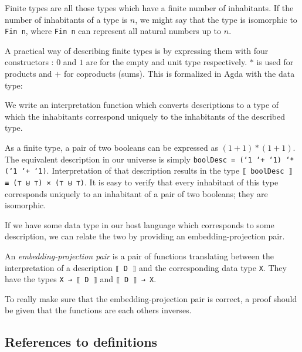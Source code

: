 Finite types are all those types which have a finite number of
inhabitants.
If the number of inhabitants of a type is $n$, we might say that the
type is isomorphic to \texttt{Fin n}, where \texttt{Fin n} can
represent all natural numbers up to $n$.

A practical way of describing finite types is by expressing them with
four constructors \cite{altenkirch06}:
$0$ and $1$ are for the empty and unit type respectively.
$*$ is used for products and $+$ for coproducts (sums).
This is formalized in Agda with the  data type:


We write an interpretation function which converts descriptions to a
type of which the inhabitants correspond uniquely to the inhabitants
of the described type.


\begin{example}
As a finite type, a pair of two booleans can be expressed as $(1 + 1)
* (1 + 1)$.
The equivalent description in our universe is simply \texttt{boolDesc
  = (`1 `+ `1) `* (`1 `+ `1)}.
Interpretation of that description results in the type
\texttt{⟦ boolDesc ⟧ ≡ (⊤ ⊎ ⊤) × (⊤ ⊎ ⊤)}.
It is easy to verify that every inhabitant of this type corresponds
uniquely to an inhabitant of a pair of two booleans; they are
isomorphic.
\end{example}

If we have some data type in our host language which corresponds to
some description, we can relate the two by providing an
embedding-projection pair.

\begin{definition}\label{def:ep-pair-finite}
  An \emph{embedding-projection pair} is a pair of functions
  translating between the interpretation of a description \texttt{⟦ D
    ⟧} and the corresponding data type \texttt{X}.
  They have the types \texttt{X → ⟦ D ⟧} and \texttt{⟦ D ⟧ → X}.
\end{definition}

To really make sure that the embedding-projection pair is correct, a
proof should be given that the functions are each others inverses.

\subsection{References to definitions}

